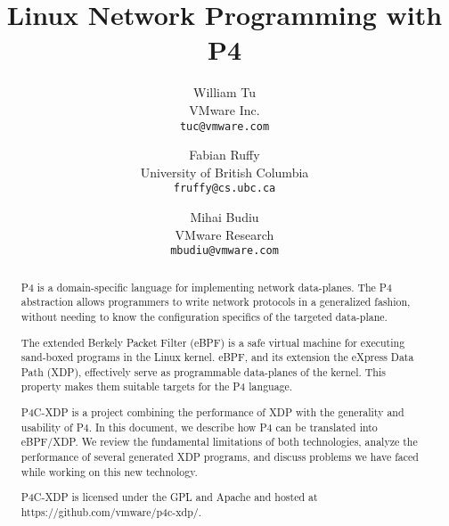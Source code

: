 \documentclass[9pt,twocolumn,times]{article}
\title{Linux Network Programming with P4}
\author{William Tu\\
  VMware Inc.\\
  \texttt{tuc@vmware.com}
  \and
  Fabian Ruffy\\
  University of British Columbia\\
  \texttt{fruffy@cs.ubc.ca}
  \and
  Mihai Budiu\\
  VMware Research\\
  \texttt{mbudiu@vmware.com}
}
\date{}
\begin{document}
\maketitle

\begin{abstract}
  P4 is a domain-specific language for implementing network data-planes.
  The P4 abstraction allows programmers to write network protocols in a 
  generalized fashion, without needing to know the configuration specifics
  of the targeted data-plane.
  
  The extended Berkely Packet Filter (eBPF) is a safe virtual machine for 
  executing sand-boxed programs in the Linux kernel. eBPF, and its extension 
  the eXpress Data Path (XDP), effectively serve as programmable data-planes of 
  the kernel. This property makes them suitable targets for the P4 language.

  P4C-XDP is a project combining the performance of XDP with the generality and 
  usability of P4. In this document, we describe how P4 can be 
  translated into eBPF/XDP. We review the fundamental limitations of both 
  technologies, analyze the performance of several generated XDP programs, and 
  discuss problems we have faced while working on this new technology.
  
  P4C-XDP is licensed under the GPL and Apache and hosted at 
  https://github.com/vmware/p4c-xdp/.
\end{abstract}











\end{document}
